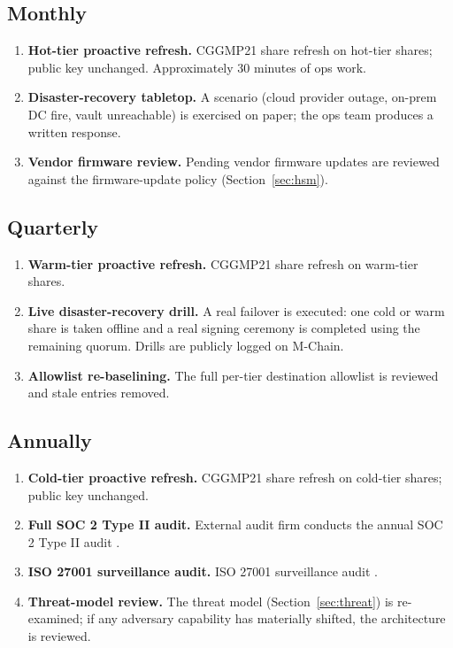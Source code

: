 \subsection{Monthly}

\begin{enumerate}[nosep]
\item \textbf{Hot-tier proactive refresh.} CGGMP21 share refresh on
hot-tier shares; public key unchanged. Approximately 30 minutes of
ops work.
\item \textbf{Disaster-recovery tabletop.} A scenario (cloud provider
outage, on-prem DC fire, vault unreachable) is exercised on paper;
the ops team produces a written response.
\item \textbf{Vendor firmware review.} Pending vendor firmware
updates are reviewed against the firmware-update policy
(Section~\ref{sec:hsm}).
\end{enumerate}

\subsection{Quarterly}

\begin{enumerate}[nosep]
\item \textbf{Warm-tier proactive refresh.} CGGMP21 share refresh
on warm-tier shares.
\item \textbf{Live disaster-recovery drill.} A real failover is
executed: one cold or warm share is taken offline and a real signing
ceremony is completed using the remaining quorum. Drills are
publicly logged on M-Chain.
\item \textbf{Allowlist re-baselining.} The full per-tier destination
allowlist is reviewed and stale entries removed.
\end{enumerate}

\subsection{Annually}

\begin{enumerate}[nosep]
\item \textbf{Cold-tier proactive refresh.} CGGMP21 share refresh
on cold-tier shares; public key unchanged.
\item \textbf{Full SOC 2 Type II audit.} External audit firm conducts
the annual SOC 2 Type II audit \cite{soc2}.
\item \textbf{ISO 27001 surveillance audit.} ISO 27001 surveillance
audit \cite{iso27001}.
\item \textbf{Threat-model review.} The threat model
(Section~\ref{sec:threat}) is re-examined; if any adversary capability
has materially shifted, the architecture is reviewed.
\end{enumerate}

